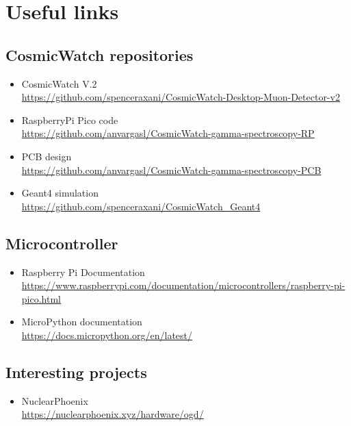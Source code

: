 \chapter{Useful links}\label{app:useful_links}

\section{CosmicWatch repositories}

\begin{itemize}
    \item CosmicWatch V.2 \\ \href{https://github.com/spenceraxani/CosmicWatch-Desktop-Muon-Detector-v2}{https://github.com/spenceraxani/CosmicWatch-Desktop-Muon-Detector-v2}
    \item RaspberryPi Pico code \\ \href{https://github.com/anvargasl/CosmicWatch-gamma-spectroscopy-RP}{https://github.com/anvargasl/CosmicWatch-gamma-spectroscopy-RP}
    \item PCB design \\ \href{https://github.com/anvargasl/CosmicWatch-gamma-spectroscopy-PCB}{https://github.com/anvargasl/CosmicWatch-gamma-spectroscopy-PCB}
    \item Geant4 simulation \\ \href{https://github.com/spenceraxani/CosmicWatch_Geant4}{https://github.com/spenceraxani/CosmicWatch\_Geant4}
\end{itemize}

\section{Microcontroller}

\begin{itemize}
    \item Raspberry Pi Documentation \\ \href{https://www.raspberrypi.com/documentation/microcontrollers/raspberry-pi-pico.html}{https://www.raspberrypi.com/documentation/microcontrollers/raspberry-pi-pico.html}
    \item MicroPython documentation \\ \href{https://docs.micropython.org/en/latest/}{https://docs.micropython.org/en/latest/}
\end{itemize}

\section{Interesting projects}

\begin{itemize}
    \item NuclearPhoenix \\ \href{https://nuclearphoenix.xyz/hardware/ogd/}{https://nuclearphoenix.xyz/hardware/ogd/}
\end{itemize}